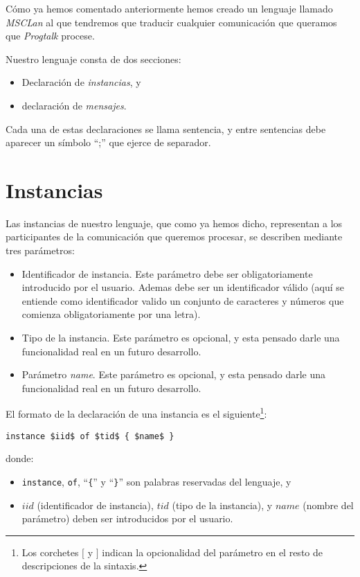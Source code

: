 Cómo ya hemos comentado anteriormente hemos creado un lenguaje llamado
\textit{MSCLan} al que tendremos que traducir cualquier comunicación
que queramos que \textit{Progtalk} procese.

Nuestro lenguaje consta de dos secciones:
\begin{itemize}
\item Declaración de \textit{instancias}, y
\item declaración de \textit{mensajes}.
\end{itemize}

Cada una de estas declaraciones se llama sentencia, y entre sentencias
debe aparecer un símbolo ``;'' que ejerce de separador.

\section{Instancias}\label{sec:Instancias}

Las instancias de nuestro lenguaje, que como ya hemos dicho,
representan a los participantes de la comunicación que queremos
procesar, se describen mediante tres
parámetros:

\begin{itemize}
\item Identificador de instancia. Este parámetro debe ser
  obligatoriamente introducido por el usuario. Ademas debe ser un
  identificador válido (aquí se entiende como identificador valido un
  conjunto de caracteres y números que comienza obligatoriamente por
  una letra).
\item Tipo de la instancia. Este parámetro es opcional, y esta pensado
  darle una funcionalidad real en un futuro desarrollo.
\item Parámetro \textit{name}. Este parámetro es opcional, y esta
  pensado darle una funcionalidad real en un futuro desarrollo.
\end{itemize}

El formato de la declaración de una instancia es el siguiente\footnote{Los corchetes $[$ y $]$ indican la opcionalidad del parámetro en el resto de descripciones de la sintaxis.}:
\begin{center}
  \begin{minipage}{0.40\linewidth}
\begin{lstlisting}[mathescape]
instance $iid$ of $tid$ { $name$ }
\end{lstlisting}
  \end{minipage}
\end{center}
donde:
\begin{itemize}
\item \lstinline{instance}, \lstinline{of}, ``\lstinline!{!'' y
    ``\lstinline!}!'' son palabras reservadas del lenguaje, y
\item $iid$ (identificador de instancia), $tid$ (tipo de la
  instancia), y $name$ (nombre del parámetro) deben ser introducidos
  por el usuario.
\end{itemize}

